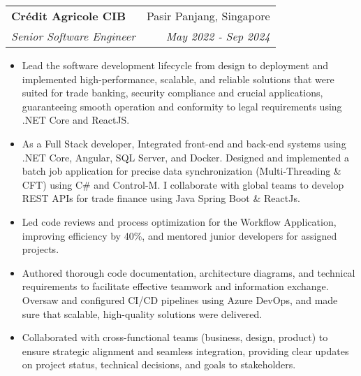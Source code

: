 \documentclass[letterpaper,11pt]{article}
\makeatletter
\newcommand{\resumeItem}[2]{
  \item\small{
    \textbf{#1}{#2 \vspace{-2pt}}
  }
}
\newcommand{\resumeSubheading}[4]{
  \vspace{-1pt}\item
    \begin{tabular*}{0.97\textwidth}[t]{l@{\extracolsep{\fill}}r}
      \textbf{#1} & #2 \\
      \textit{\small#3} & \textit{\small #4} \\
    \end{tabular*}\vspace{-5pt}
}
\newcommand{\resumeItemListStart}{\begin{itemize}}
\newcommand{\resumeItemListEnd}{\end{itemize}\vspace{-5pt}}
\makeatother
\begin{document}
    \resumeSubheading
      {Crédit Agricole CIB}{Pasir Panjang, Singapore}
      {Senior Software Engineer}{May 2022 - Sep 2024}
      \resumeItemListStart
        \resumeItem{}
        {Lead the software development lifecycle from design to deployment and implemented high-performance, scalable, and reliable solutions that were suited for trade banking, security compliance and crucial applications, guaranteeing smooth operation and conformity to legal requirements using .NET Core and ReactJS. }
        \resumeItem{}
        {As a Full Stack developer, Integrated front-end and back-end systems using .NET Core, Angular, SQL Server, and Docker. Designed and implemented a batch job application for precise data synchronization (Multi-Threading \& CFT) using C\# and Control-M. I collaborate with global teams to develop REST APIs for trade finance using Java Spring Boot \& ReactJs.}
        \resumeItem{}
        {Led code reviews and process optimization for the Workflow Application, improving efficiency by 40\%, and mentored junior developers for assigned projects.}
        \resumeItem{}
        {Authored thorough code documentation, architecture diagrams, and technical requirements to facilitate effective teamwork and information exchange. Oversaw and configured CI/CD pipelines using Azure DevOps, and made sure that scalable, high-quality solutions were delivered.}
        \resumeItem{}
        {Collaborated with cross-functional teams (business, design, product) to ensure strategic alignment and seamless integration, providing clear updates on project status, technical decisions, and goals to stakeholders.}

    \resumeItemListEnd
      
\end{document}
